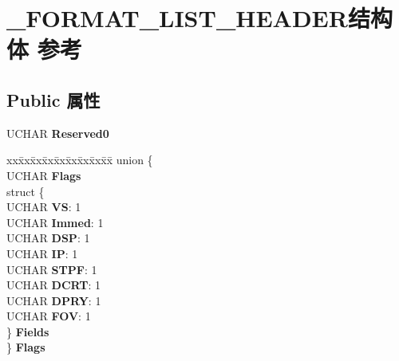 \hypertarget{struct___f_o_r_m_a_t___l_i_s_t___h_e_a_d_e_r}{}\section{\+\_\+\+F\+O\+R\+M\+A\+T\+\_\+\+L\+I\+S\+T\+\_\+\+H\+E\+A\+D\+E\+R结构体 参考}
\label{struct___f_o_r_m_a_t___l_i_s_t___h_e_a_d_e_r}
\subsection*{Public 属性}
\begin{DoxyCompactItemize}
\item 
\mbox{\label{struct___f_o_r_m_a_t___l_i_s_t___h_e_a_d_e_r_a7932f0916dc83782f895243d5c590462}} 
U\+C\+H\+AR {\bfseries Reserved0}
\item 
\mbox{\label{struct___f_o_r_m_a_t___l_i_s_t___h_e_a_d_e_r_ab86da917ddd299c680883ded327042ad}} 
\begin{tabbing}
xx\=xx\=xx\=xx\=xx\=xx\=xx\=xx\=xx\=\kill
union \{\\
\>UCHAR {\bfseries Flags}\\
\>struct \{\\
\>\>UCHAR {\bfseries VS}: 1\\
\>\>UCHAR {\bfseries Immed}: 1\\
\>\>UCHAR {\bfseries DSP}: 1\\
\>\>UCHAR {\bfseries IP}: 1\\
\>\>UCHAR {\bfseries STPF}: 1\\
\>\>UCHAR {\bfseries DCRT}: 1\\
\>\>UCHAR {\bfseries DPRY}: 1\\
\>\>UCHAR {\bfseries FOV}: 1\\
\>\} {\bfseries Fields}\\
\} {\bfseries Flags}\\


\end{tabbing}
\end{DoxyCompactItemize}
